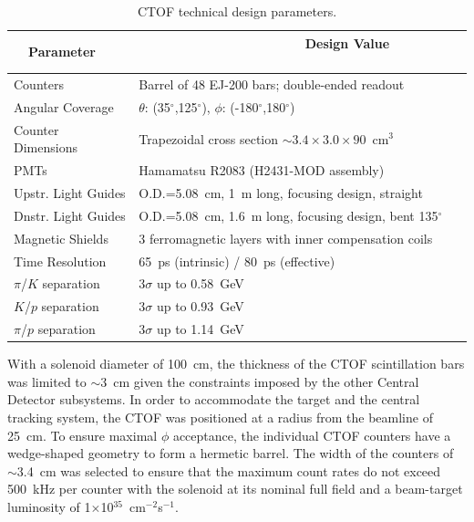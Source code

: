 \documentclass[3p,times,twocolumn]{elsarticle}
\begin{document}
\begin{table}[ht]
\begin{center}
\begin{tabular} {l|l} \hline
~~Parameter~~ &~~~~~~~~~~~~~~~~~~~~~~ Design Value ~~~~~~~~~~\\ \hline
Counters             & Barrel of 48 EJ-200 bars; double-ended readout \\
Angular Coverage     & $\theta$: (35$^\circ$,125$^\circ$), $\phi$: (-180$^\circ$,180$^\circ$) \\
Counter Dimensions   & Trapezoidal cross section $\sim 3.4 \times 3.0 \times 90$~cm$^3$ \\
PMTs                 & Hamamatsu R2083 (H2431-MOD assembly)    \\
Upstr. Light Guides  & O.D.=5.08~cm, 1~m long, focusing design, straight \\
Dnstr. Light Guides  & O.D.=5.08~cm, 1.6~m long, focusing design, bent 135$^\circ$ \\
Magnetic Shields     & 3 ferromagnetic layers with inner compensation coils \\
Time Resolution    & 65~ps (intrinsic) / 80~ps (effective) \\
$\pi$/$K$ separation & 3$\sigma$ up to 0.58~GeV \\ 
$K$/$p$ separation   & 3$\sigma$ up to 0.93~GeV \\ 
$\pi$/$p$ separation & 3$\sigma$ up to 1.14~GeV \\ \hline
\end{tabular}
\end{center}
\caption{CTOF technical design parameters.}
\label{spec-table}
\end{table}

With a solenoid diameter of 100~cm, the thickness of the CTOF scintillation bars was limited to $\sim$3~cm
given the constraints imposed by the other Central Detector subsystems. In order to accommodate the target
and the central tracking system, the CTOF was positioned at a radius from the beamline of 25~cm. To ensure
maximal $\phi$ acceptance, the individual CTOF counters have a wedge-shaped geometry to form a hermetic
barrel. The width of the counters of $\sim$3.4~cm was selected to ensure that the maximum count rates do
not exceed 500~kHz per counter with the solenoid at its nominal full field and a beam-target luminosity of
1$\times$10$^{35}$~cm$^{-2}$s$^{-1}$.
\end{document}
